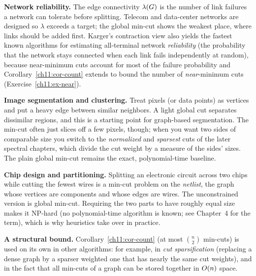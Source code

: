\begin{applicationbox}
\textbf{Network reliability.} The edge connectivity $\lambda(G)$ is the number of link failures a network can tolerate before splitting. Telecom and data-center networks are designed so $\lambda$ exceeds a target; the global min-cut shows the weakest place, where links should be added first. Karger's contraction view also yields the fastest known algorithms for estimating all-terminal network \emph{reliability} (the probability that the network stays connected when each link fails independently at random), because near-minimum cuts account for most of the failure probability and Corollary~\ref{ch11:cor-count} extends to bound the number of \emph{near}-minimum cuts (Exercise~\ref{ch11:ex-near}).

\textbf{Image segmentation and clustering.} Treat pixels (or data points) as vertices and put a heavy edge between similar neighbors. A light global cut separates dissimilar regions, and this is a starting point for graph-based segmentation. The min-cut often just slices off a few pixels, though; when you want two sides of comparable size you switch to the \emph{normalized} and \emph{sparsest} cuts of the later spectral chapters, which divide the cut weight by a measure of the sides' sizes. The plain global min-cut remains the exact, polynomial-time baseline.

\textbf{Chip design and partitioning.} Splitting an electronic circuit across two chips while cutting the fewest wires is a min-cut problem on the \emph{netlist}, the graph whose vertices are components and whose edges are wires. The unconstrained version is global min-cut. Requiring the two parts to have roughly equal size makes it NP-hard (no polynomial-time algorithm is known; see Chapter~4 for the term), which is why heuristics take over in practice.

\textbf{A structural bound.} Corollary~\ref{ch11:cor-count} (at most $\binom n2$ min-cuts) is used on its own in other algorithms: for example, in \emph{cut sparsification} (replacing a dense graph by a sparser weighted one that has nearly the same cut weights), and in the fact that all min-cuts of a graph can be stored together in $O(n)$ space.
\end{applicationbox}

